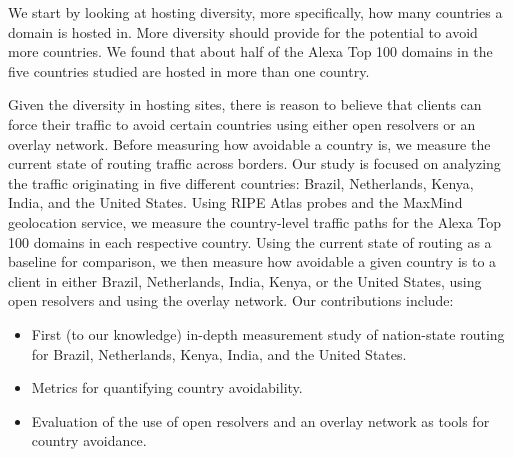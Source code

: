 We start by looking at hosting diversity, more specifically, how many
countries a domain is hosted in.  More diversity should provide for the
potential to avoid more countries.  We found that about half of the
Alexa Top 100 domains in the five countries studied are hosted in more
than one country. 

Given the diversity in hosting sites, there is reason to believe that
clients can force their traffic to avoid certain countries using either
open resolvers or an overlay network.  Before measuring how avoidable a
country is, we measure the current state of routing traffic across
borders.  Our study is focused on analyzing the traffic originating in
five different countries: Brazil, Netherlands, Kenya, India, and the
United States.  Using RIPE Atlas probes and the MaxMind geolocation
service, we measure the country-level traffic paths for the Alexa Top
100 domains in each respective country.  Using the current state of
routing as a baseline for comparison, we then measure how avoidable a
given country is to a client in either Brazil, Netherlands, India,
Kenya, or the United States, using open resolvers and using the overlay
network.  Our contributions include: 

\begin{itemize}
\item First (to our knowledge) in-depth measurement study of
  nation-state routing for Brazil, Netherlands, Kenya, India, and the
  United States. 
\item Metrics for quantifying country avoidability.
\item Evaluation of the use of open resolvers and an overlay network as tools for country avoidance.
\end{itemize}

